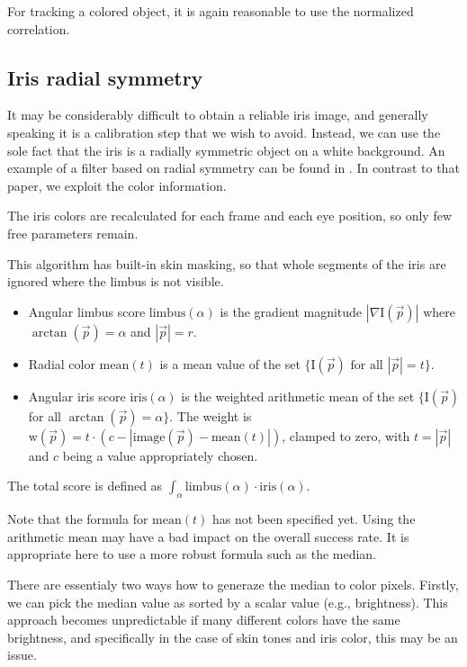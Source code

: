 For tracking a colored object, it is again reasonable to use the normalized correlation.

\subsection{Iris radial symmetry}

It may be considerably difficult to obtain a reliable iris image, and generally speaking it is a calibration step that we wish to avoid.
Instead, we can use the sole fact that the iris is a radially symmetric object on a white background.
An example of a filter based on radial symmetry can be found in \cite{leo14}.
In contrast to that paper, we exploit the color information.

The iris colors are recalculated for each frame and each eye position, so only few free parameters remain.

This algorithm has built-in skin masking, so that whole segments of the iris are ignored where the limbus is not visible.

\begin{itemize}
\item
Angular limbus score $\textrm{limbus}(\alpha)$ is the gradient magnitude $|\nabla \textrm{I}(\vec p)|$ where $\arctan(\vec p) = \alpha$ and $|\vec p| = r$.

\item
Radial color $\textrm{mean}(t)$ is a mean value of the set $\{\textrm{I}(\vec p) \text{ for all } |\vec p| = t \}$.

\item
Angular iris score $\textrm{iris}(\alpha)$ is the weighted arithmetic mean of the set $\{\textrm{I}(\vec p)$ for all $\arctan(\vec p) = \alpha \}$.
The weight is $\textrm{w}(\vec p) = t \cdot (c - |\textrm{image}(\vec p) - \textrm{mean}(t)|)$, clamped to zero, with $t = |\vec p|$ and $c$ being a value appropriately chosen.

\end{itemize}

The total score is defined as $\int_\alpha \textrm{limbus}(\alpha) \cdot \textrm{iris}(\alpha)$.

Note that the formula for $\textrm{mean}(t)$ has not been specified yet.
Using the arithmetic mean may have a bad impact on the overall success rate.
It is appropriate here to use a more robust formula such as the median.

There are essentialy two ways how to generaze the median to color pixels.
Firstly, we can pick the median value as sorted by a scalar value (e.g., brightness).
This approach becomes unpredictable if many different colors have the same brightness, and specifically in the case of skin tones and iris color, this may be an issue.

